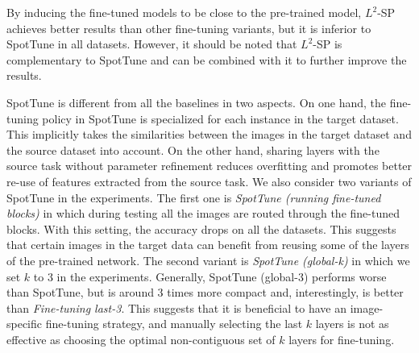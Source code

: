 \documentclass[10pt,twocolumn,letterpaper]{article}
\begin{document}
By inducing the fine-tuned models to be close to the pre-trained model, $L^2$-SP achieves better results than other fine-tuning variants, but it is inferior to SpotTune in all datasets. However, it should be noted that $L^2$-SP is complementary to SpotTune and can be combined with it to further improve the results.

SpotTune is different from all the baselines in two aspects. On one hand, the fine-tuning policy in SpotTune is specialized for each instance in the target dataset. This implicitly takes the similarities between the images in the target dataset and the source dataset into account. On the other hand, sharing layers with the source task without parameter refinement reduces overfitting and promotes better re-use of features extracted from the source task. 
We also consider two variants of SpotTune in the experiments. The first one is {\em SpotTune (running fine-tuned blocks)} in which during testing all the images are routed through the fine-tuned blocks. With this setting, the accuracy drops on all the datasets. This suggests that certain images in the target data can benefit from reusing some of the layers of the pre-trained network. The second variant is {\em SpotTune (global-k)} in which we set $k$ to 3 in the experiments. Generally, SpotTune (global-3) performs worse than SpotTune, but is around 3 times more compact and, interestingly, is better than {\em Fine-tuning last-3}. This suggests that it is beneficial to have an image-specific fine-tuning strategy, and manually selecting the last $k$ layers is not as effective as choosing the optimal non-contiguous set of $k$ layers for fine-tuning.
\def\arraystretch{1.2}%
	\small
\end{document}
